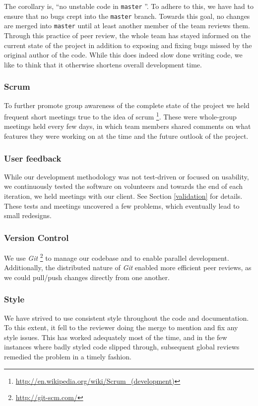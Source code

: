 \documentclass[a4paper,11pt,titlepage]{article}
\newcommand{\code}[1]{\texttt{#1}}
\newcommand{\buzz}[1]{\emph{#1}}
\newcommand{\master}{\code{master} }
\newcommand{\Git}{\buzz{Git} }
\begin{document}
The corollary is, ``no unstable code in \master''. To adhere to this,
we have had to ensure that no bugs crept into the \master
branch. Towards this goal, no changes are merged into \master until at
least another member of the team reviews them. Through this practice
of peer review, the whole team has stayed informed on the current
state of the project in addition to exposing and fixing bugs missed by
the original author of the code. While this does indeed slow done
writing code, we like to think that it otherwise shortens overall
development time.

\subsubsection{Scrum}
To further promote group awareness of the complete state of the
project we held frequent short meetings true to the idea of
scrum \footnote{\url{http://en.wikipedia.org/wiki/Scrum_(development)}}.
These were whole-group meetings held every few days, in which team
members shared comments on what features they were working on at the
time and the future outlook of the project.

\subsubsection{User feedback}
While our development methodology was not test-driven or focused on
usability, we continuously tested the software on volunteers and
towards the end of each iteration, we held meetings with our
client. See Section \ref{validation} for details. These tests and
meetings uncovered a few problems, which eventually lead to small
redesigns.

\subsubsection{Version Control}
We use \Git \footnote{\url{http://git-scm.com/}} to manage our
codebase and to enable parallel development. Additionally, the
distributed nature of \Git enabled more efficient peer reviews, as we
could pull/push changes directly from one another.

\subsubsection{Style}
We have strived to use consistent style throughout the code and
documentation. To this extent, it fell to the reviewer doing the merge
to mention and fix any style issues. This has worked adequately most
of the time, and in the few instances where badly styled code slipped
through, subsequent global reviews remedied the problem in a timely
fashion.
\end{document}

